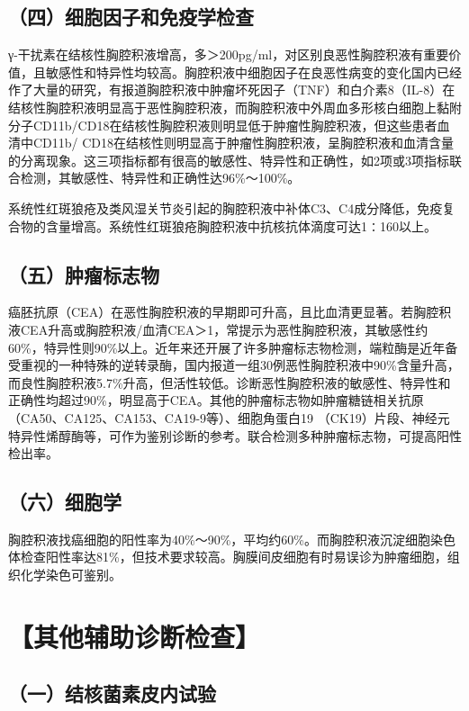 \subsection{（四）细胞因子和免疫学检查}

γ-干扰素在结核性胸腔积液增高，多＞200pg/ml，对区别良恶性胸腔积液有重要价值，且敏感性和特异性均较高。胸腔积液中细胞因子在良恶性病变的变化国内已经作了大量的研究，有报道胸腔积液中肿瘤坏死因子（TNF）和白介素8（IL-8）在结核性胸腔积液明显高于恶性胸腔积液，而胸腔积液中外周血多形核白细胞上黏附分子CD11b/CD18在结核性胸腔积液则明显低于肿瘤性胸腔积液，但这些患者血清中CD11b/
CD18在结核性则明显高于肿瘤性胸腔积液，呈胸腔积液和血清含量的分离现象。这三项指标都有很高的敏感性、特异性和正确性，如2项或3项指标联合检测，其敏感性、特异性和正确性达96\%～100\%。

系统性红斑狼疮及类风湿关节炎引起的胸腔积液中补体C3、C4成分降低，免疫复合物的含量增高。系统性红斑狼疮胸腔积液中抗核抗体滴度可达1∶160以上。

\subsection{（五）肿瘤标志物}

癌胚抗原（CEA）在恶性胸腔积液的早期即可升高，且比血清更显著。若胸腔积液CEA升高或胸腔积液/血清CEA＞1，常提示为恶性胸腔积液，其敏感性约60\%，特异性则90\%以上。近年来还开展了许多肿瘤标志物检测，端粒酶是近年备受重视的一种特殊的逆转录酶，国内报道一组30例恶性胸腔积液中90\%含量升高，而良性胸腔积液5.7\%升高，但活性较低。诊断恶性胸腔积液的敏感性、特异性和正确性均超过90\%，明显高于CEA。其他的肿瘤标志物如肿瘤糖链相关抗原（CA50、CA125、CA153、CA19-9等）、细胞角蛋白19
（CK19）片段、神经元特异性烯醇酶等，可作为鉴别诊断的参考。联合检测多种肿瘤标志物，可提高阳性检出率。

\subsection{（六）细胞学}

胸腔积液找癌细胞的阳性率为40\%～90\%，平均约60\%。而胸腔积液沉淀细胞染色体检查阳性率达81\%，但技术要求较高。胸膜间皮细胞有时易误诊为肿瘤细胞，组织化学染色可鉴别。

\section{【其他辅助诊断检查】}

\subsection{（一）结核菌素皮内试验}

